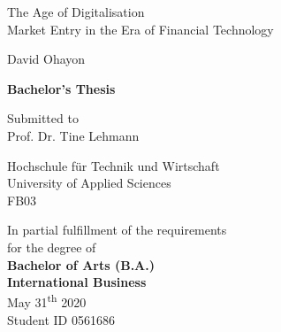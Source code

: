 \documentclass[11pt,a4paper]{article}
\begin{document}
  
   

\begin{titlepage}    
\begin{center} 

\vspace*{2cm}

{\Huge{The Age of Digitalisation}} \\
\vspace*{0.4cm} 
\LARGE{Market Entry in the Era of Financial Technology}

\vspace*{1.5cm} 

\Large{David Ohayon}\\


\vspace*{1.5cm}

\large{
\textbf{Bachelor's Thesis}\\
} 
      
\vspace*{1cm}

\large{Submitted to\\
Prof. Dr. Tine Lehmann\\}

\vspace*{1.0cm}
\large{Hochschule für Technik und Wirtschaft\\}
\large{University of Applied Sciences\\}
\large{FB03}
\vspace*{1.0cm}

\vspace*{2cm}
\small{In partial fulfillment of the requirements\\
for the degree of \\
\vspace{4mm}
\normalsize \textbf{Bachelor of Arts (B.A.) \\
International Business}\\
}
\vspace{1cm}
\large{May 31\textsuperscript{th} 2020}\\
\large{Student ID 0561686}\\
      
\end{center}
\end{titlepage}
\end{document}
